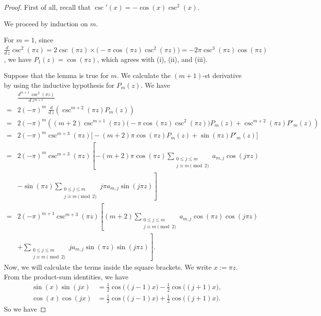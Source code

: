 \documentclass[a4paper,dvipdfmx]{amsart}
\theoremstyle{plain}
\theoremstyle{definition}
\theoremstyle{remark}
\numberwithin{equation}{section}
\begin{document}
\begin{proof}
First of all, recall that $\csc'(x)=-\cos(x)\csc^2(x)$.
\par
We proceed by induction on $m$.
\par
For $m=1$, since $\frac{d}{d\,z}\csc^2(\pi z)=2\csc(\pi z)\times\bigl(-\pi\cos(\pi z)\csc^2(\pi z)\bigr)=-2\pi\csc^3(\pi z)\cos(\pi z)$, we have $P_1(z)=\cos(\pi z)$, which agrees with (i), (ii), and (iii).
\par
Suppose that the lemma is true for $m$.
We calculate the $(m+1)$-st derivative by using the inductive hypothesis for $P_m(z)$.
We have
\begin{align*}
  &
  \frac{d^{m+1}\,\csc^2(\pi z)}{d\,z^{m+1}}
  \\
  =&
  2(-\pi)^m\
  \frac{d}{d\,z}
  \left(
    \csc^{m+2}(\pi z)P_m(z)
  \right)
  \\
  =&
  2(-\pi)^{m}
  \left(
    (m+2)\csc^{m+1}(\pi z)\bigl(-\pi\cos(\pi z)\csc^2(\pi z)\bigr)P_m(z)
    +
    \csc^{m+2}(\pi z)P'_{m}(z)
  \right)
  \\
  =&
  2(-\pi)^{m}\csc^{m+3}(\pi z)
  \bigl[
    -(m+2)\pi\cos(\pi z)P_m(z)
    +
    \sin(\pi z)P'_{m}(z)
  \bigr]
  \\
  =&
  2(-\pi)^{m}\csc^{m+3}(\pi z)
  \left[
    -(m+2)\pi\cos(\pi z)
    \sum_{\substack{0\le j\le m\\ j\equiv m\pmod{2}}}a_{m,j}\cos(j\pi z)
  \right.
  \\
  &-
  \left.
    \sin(\pi z)
    \sum_{\substack{0\le j\le m\\ j\equiv m\pmod{2}}}j\pi a_{m,j}\sin(j\pi z)
  \right]
  \\
  =&
  2(-\pi)^{m+1}\csc^{m+3}(\pi z)
  \left[
    (m+2)
    \sum_{\substack{0\le j\le m\\ j\equiv m\pmod{2}}}a_{m,j}\cos(\pi z)\cos(j\pi z)
  \right.
  \\
  &+
  \left.
    \sum_{\substack{0\le j\le m\\ j\equiv m\pmod{2}}}ja_{m,j}\sin(\pi z)\sin(j\pi z)
  \right].
\end{align*}
Now, we will calculate the terms inside the square brackets.
We write $x:=\pi z$.
From the product-sum identities, we have
\begin{align*}
  \sin(x)\sin(jx)
  &=
  \frac{1}{2}\cos\bigl((j-1)x\bigr)-\frac{1}{2}\cos\bigl((j+1)x\bigr),
  \\
  \cos(x)\cos(jx)
  &=
  \frac{1}{2}\cos\bigl((j-1)x\bigr)+\frac{1}{2}\cos\bigl((j+1)x\bigr).
\end{align*}
So we have

\end{proof}
\end{document}
